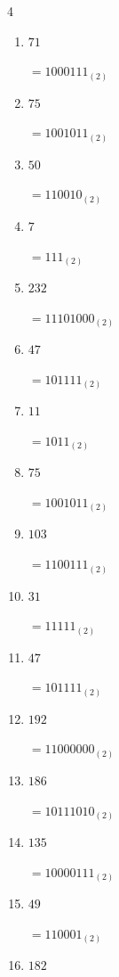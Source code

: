 \begin{multicols}{4}
\begin{enumerate}
\columnbreak %

  \item $71$

        $=1000111_{(2)}$

  \item $75$

        $=1001011_{(2)}$

  \item $50$

        $=110010_{(2)}$

  \item $7$

        $=111_{(2)}$

  \item $232$

        $=11101000_{(2)}$

  \item $47$

        $=101111_{(2)}$

  \item $11$

        $=1011_{(2)}$

  \item $75$

        $=1001011_{(2)}$

  \item $103$

        $=1100111_{(2)}$

  \item $31$

        $=11111_{(2)}$

  \item $47$

        $=101111_{(2)}$

  \item $192$

        $=11000000_{(2)}$

  \item $186$

        $=10111010_{(2)}$

  \item $135$

        $=10000111_{(2)}$

  \item $49$

        $=110001_{(2)}$

\columnbreak %

  \item $182$


\end{enumerate}
\end{multicols}
